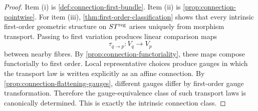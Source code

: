 \begin{proof}
	Item \textup{(i)} is \cref{def:connection-first-bundle}.  Item
	\textup{(ii)} is \cref{prop:connection-pointwise}.
	For item \textup{(iii)}, \cref{thm:first-order-classification} shows
	that every intrinsic first-order geometric structure on \(ST^{\mathrm{reg}}\)
	arises uniquely from morphism transport.  Passing to first variation
	produces linear comparison maps
	\[
		\tau_{q\to p}:V_q\to V_p
	\]
	between nearby fibres.  By \cref{prop:connection-functoriality}, these
	maps compose functorially to first order.
	Local representative choices produce gauges in which the transport law
	is written explicitly as an affine connection.  By
	\cref{prop:connection-flattening-gauges}, different gauges differ by
	first-order gauge transformation.  Therefore the gauge-equivalence class
	of such transport laws is canonically determined.
	This is exactly the intrinsic connection class.
\end{proof}
